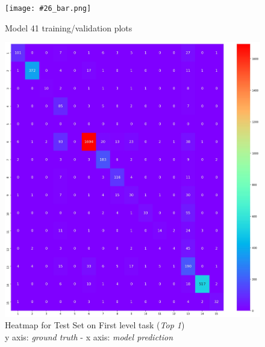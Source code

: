 \documentclass[12pt]{article}
\begin{document}
\begin{figure}[ht!]
        \begin{adjustwidth}{-3.2cm}{}
    	    \begin{center}
        \texttt{[image: \#26\_bar.png]}
            \end{center}
	    \end{adjustwidth}
        \caption{Model 41 training/validation plots}
        \label{fig:model41}
\end{figure}
\newpage
{}
\begin{figure}[ht!]
        \begin{adjustwidth}{-3.2cm}{}
    	    \begin{center}
        \includegraphics[width=1.45\textwidth]{heat_first.jpg}
            \end{center}
	    \end{adjustwidth}
	    \captionsetup{justification   = centering}
        \caption{Heatmap for Test Set on First level task (\textit{Top 1}) \\y axis: \textit{ground truth} - x axis: \textit{model prediction}}
        \label{fig:heatfirst1}
\end{figure}
\end{document}
